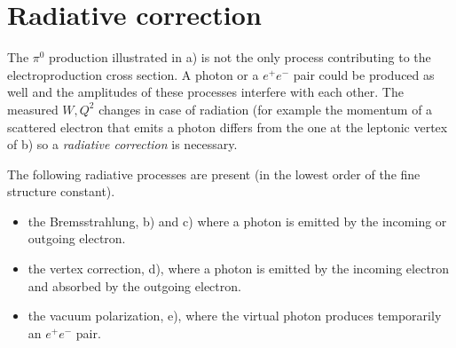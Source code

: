 \cia\vspace{-2cm}
\section{Radiative correction}
The $\pi^0$ production illustrated in  a) is not the only process 
contributing to the electroproduction cross section. A photon or a $e^+e^- $ pair could be produced as well
and the amplitudes of these processes interfere with each other.
The measured $W, Q^2$  changes in case of radiation (for 
example the momentum of a scattered electron that emits a photon differs from the one at the 
leptonic vertex of  b) so a {\em radiative correction} is necessary. 


The  following radiative processes are present (in the lowest order of the fine structure constant).
\begin{itemize}
\item
the Bremsstrahlung,  b) and c) where a photon is emitted by the incoming or outgoing electron.
\item
the vertex correction,  d), where a photon is emitted by the incoming electron and 
absorbed by the outgoing
electron.
\item the vacuum polarization,  e), 
where the virtual photon produces temporarily an $e^+e^-$ pair.
\end{itemize}

